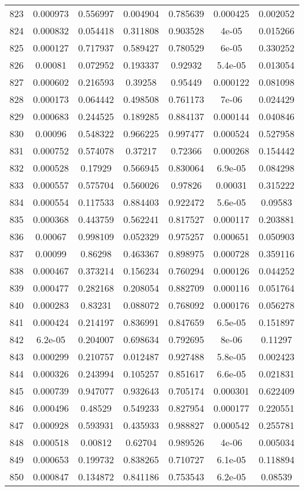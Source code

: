 \begin{table}
\begin{tabular}{c|c|c|c|c|c|c}
823 & 0.000973 & 0.556997 & 0.004904 & 0.785639 & 0.000425 & 0.002052\\
824 & 0.000832 & 0.054418 & 0.311808 & 0.903528 & 4e-05 & 0.015266\\
825 & 0.000127 & 0.717937 & 0.589427 & 0.780529 & 6e-05 & 0.330252\\
826 & 0.00081 & 0.072952 & 0.193337 & 0.92932 & 5.4e-05 & 0.013054\\
827 & 0.000602 & 0.216593 & 0.39258 & 0.95449 & 0.000122 & 0.081098\\
828 & 0.000173 & 0.064442 & 0.498508 & 0.761173 & 7e-06 & 0.024429\\
829 & 0.000683 & 0.244525 & 0.189285 & 0.884137 & 0.000144 & 0.040846\\
830 & 0.00096 & 0.548322 & 0.966225 & 0.997477 & 0.000524 & 0.527958\\
831 & 0.000752 & 0.574078 & 0.37217 & 0.72366 & 0.000268 & 0.154442\\
832 & 0.000528 & 0.17929 & 0.566945 & 0.830064 & 6.9e-05 & 0.084298\\
833 & 0.000557 & 0.575704 & 0.560026 & 0.97826 & 0.00031 & 0.315222\\
834 & 0.000554 & 0.117533 & 0.884403 & 0.922472 & 5.6e-05 & 0.09583\\
835 & 0.000368 & 0.443759 & 0.562241 & 0.817527 & 0.000117 & 0.203881\\
836 & 0.00067 & 0.998109 & 0.052329 & 0.975257 & 0.000651 & 0.050903\\
837 & 0.00099 & 0.86298 & 0.463367 & 0.898975 & 0.000728 & 0.359116\\
838 & 0.000467 & 0.373214 & 0.156234 & 0.760294 & 0.000126 & 0.044252\\
839 & 0.000477 & 0.282168 & 0.208054 & 0.882709 & 0.000116 & 0.051764\\
840 & 0.000283 & 0.83231 & 0.088072 & 0.768092 & 0.000176 & 0.056278\\
841 & 0.000424 & 0.214197 & 0.836991 & 0.847659 & 6.5e-05 & 0.151897\\
842 & 6.2e-05 & 0.204007 & 0.698634 & 0.792695 & 8e-06 & 0.11297\\
843 & 0.000299 & 0.210757 & 0.012487 & 0.927488 & 5.8e-05 & 0.002423\\
844 & 0.000326 & 0.243994 & 0.105257 & 0.851617 & 6.6e-05 & 0.021831\\
845 & 0.000739 & 0.947077 & 0.932643 & 0.705174 & 0.000301 & 0.622409\\
846 & 0.000496 & 0.48529 & 0.549233 & 0.827954 & 0.000177 & 0.220551\\
847 & 0.000928 & 0.593931 & 0.435933 & 0.988827 & 0.000542 & 0.255781\\
848 & 0.000518 & 0.00812 & 0.62704 & 0.989526 & 4e-06 & 0.005034\\
849 & 0.000653 & 0.199732 & 0.838265 & 0.710727 & 6.1e-05 & 0.118894\\
850 & 0.000847 & 0.134872 & 0.841186 & 0.753543 & 6.2e-05 & 0.08539\\
\end{tabular}
\end{table}
